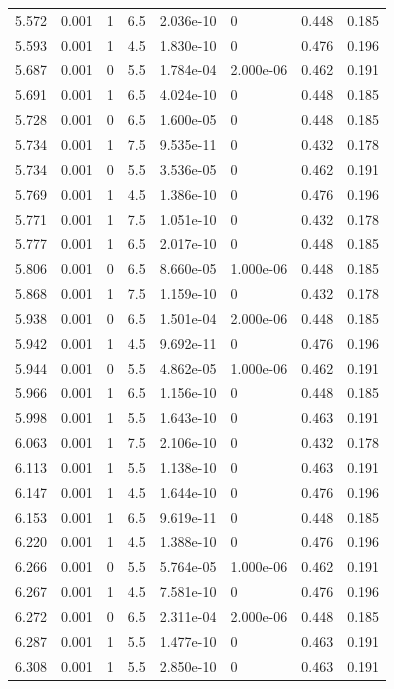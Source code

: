 \documentclass[preview]{standalone}
\begin{document}
{{{\begin{tabular}{L{1.2cm}C{1.2cm} C{0.3cm}C{0.5cm} C{1.4cm}C{1.4cm} C{1.4cm}C{1.4cm}}
  5.572  &  0.001  & 1     & 6.5 &  2.036e-10  & 0  & 0.448 &  0.185   \\ 
  5.593  &  0.001  & 1     & 4.5 &  1.830e-10  & 0  & 0.476 &  0.196   \\ 
  5.687  &  0.001  & 0     & 5.5 &  1.784e-04  & 2.000e-06  & 0.462 &  0.191   \\ 
  5.691  &  0.001  & 1     & 6.5 &  4.024e-10  & 0  & 0.448 &  0.185   \\ 
  5.728  &  0.001  & 0     & 6.5 &  1.600e-05  & 0  & 0.448 &  0.185   \\ 
  5.734  &  0.001  & 1     & 7.5 &  9.535e-11  & 0  & 0.432 &  0.178   \\ 
  5.734  &  0.001  & 0     & 5.5 &  3.536e-05  & 0  & 0.462 &  0.191   \\ 
  5.769  &  0.001  & 1     & 4.5 &  1.386e-10  & 0  & 0.476 &  0.196   \\ 
  5.771  &  0.001  & 1     & 7.5 &  1.051e-10  & 0  & 0.432 &  0.178   \\ 
  5.777  &  0.001  & 1     & 6.5 &  2.017e-10  & 0  & 0.448 &  0.185   \\ 
  5.806  &  0.001  & 0     & 6.5 &  8.660e-05  & 1.000e-06  & 0.448 &  0.185   \\ 
  5.868  &  0.001  & 1     & 7.5 &  1.159e-10  & 0  & 0.432 &  0.178   \\ 
  5.938  &  0.001  & 0     & 6.5 &  1.501e-04  & 2.000e-06  & 0.448 &  0.185   \\ 
  5.942  &  0.001  & 1     & 4.5 &  9.692e-11  & 0  & 0.476 &  0.196   \\ 
  5.944  &  0.001  & 0     & 5.5 &  4.862e-05  & 1.000e-06  & 0.462 &  0.191   \\ 
  5.966  &  0.001  & 1     & 6.5 &  1.156e-10  & 0  & 0.448 &  0.185   \\ 
  5.998  &  0.001  & 1     & 5.5 &  1.643e-10  & 0  & 0.463 &  0.191   \\ 
  6.063  &  0.001  & 1     & 7.5 &  2.106e-10  & 0  & 0.432 &  0.178   \\ 
  6.113  &  0.001  & 1     & 5.5 &  1.138e-10  & 0  & 0.463 &  0.191   \\ 
  6.147  &  0.001  & 1     & 4.5 &  1.644e-10  & 0  & 0.476 &  0.196   \\ 
  6.153  &  0.001  & 1     & 6.5 &  9.619e-11  & 0  & 0.448 &  0.185   \\ 
  6.220  &  0.001  & 1     & 4.5 &  1.388e-10  & 0  & 0.476 &  0.196   \\ 
  6.266  &  0.001  & 0     & 5.5 &  5.764e-05  & 1.000e-06  & 0.462 &  0.191   \\ 
  6.267  &  0.001  & 1     & 4.5 &  7.581e-10  & 0  & 0.476 &  0.196   \\ 
  6.272  &  0.001  & 0     & 6.5 &  2.311e-04  & 2.000e-06  & 0.448 &  0.185   \\ 
  6.287  &  0.001  & 1     & 5.5 &  1.477e-10  & 0  & 0.463 &  0.191   \\ 
  6.308  &  0.001  & 1     & 5.5 &  2.850e-10  & 0  & 0.463 &  0.191   \\ 
\hline 
\end{tabular} 

}}}
\end{document}
